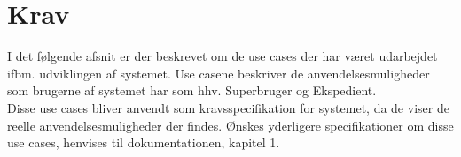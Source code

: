 \chapter{Krav}
I det følgende afsnit er der beskrevet om de use cases der har været udarbejdet ifbm. udviklingen af systemet. Use casene beskriver de anvendelsesmuligheder som brugerne af systemet har som hhv. Superbruger og Ekspedient.\\
Disse use cases bliver anvendt som kravsspecifikation for systemet, da de viser de reelle anvendelsesmuligheder der findes. Ønskes yderligere specifikationer om disse use cases, henvises til dokumentationen, kapitel 1.

